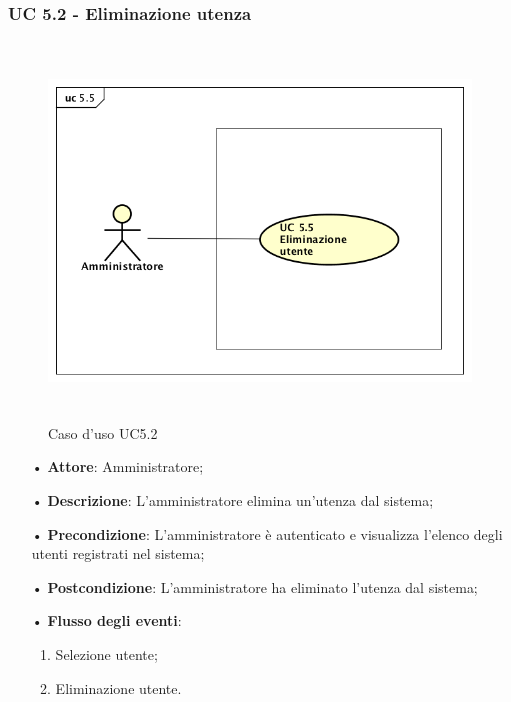 \subsubsection{UC 5.2 - Eliminazione utenza}
\begin{figure}[H]
\centering
\includegraphics[width=17cm, height=10cm]{img/UC55.png} 
\caption{Caso d'uso UC5.2}
\end{figure}
\begin{itemize}
\item[•] \textbf{Attore}: Amministratore;

\item[•] \textbf{Descrizione}: L'amministratore elimina un'utenza dal sistema;

\item[•] \textbf{Precondizione}: L'amministratore \`{e} autenticato e visualizza l'elenco degli utenti registrati nel sistema;

\item[•] \textbf{Postcondizione}: L'amministratore ha eliminato l'utenza dal sistema; 

\item[•] \textbf{Flusso degli eventi}:

\begin{enumerate}

\item Selezione utente;

\item Eliminazione utente.

\end{enumerate}

\end{itemize}
